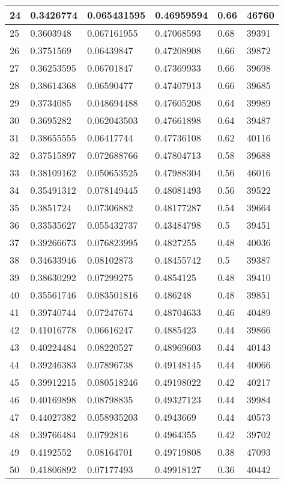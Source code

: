 \begin{longtable}{|l|l|l|l|l|l|}
24 & 0.3426774 & 0.065431595 & 0.46959594 & 0.66 & 46760 \\ \hline 
25 & 0.3603948 & 0.067161955 & 0.47068593 & 0.68 & 39391 \\ \hline 
26 & 0.3751569 & 0.06439847 & 0.47208908 & 0.66 & 39872 \\ \hline 
27 & 0.36253595 & 0.06701847 & 0.47369933 & 0.66 & 39698 \\ \hline 
28 & 0.38614368 & 0.06590477 & 0.47407913 & 0.66 & 39685 \\ \hline 
29 & 0.3734085 & 0.048694488 & 0.47605208 & 0.64 & 39989 \\ \hline 
30 & 0.3695282 & 0.062043503 & 0.47661898 & 0.64 & 39487 \\ \hline 
31 & 0.38655555 & 0.06417744 & 0.47736108 & 0.62 & 40116 \\ \hline 
32 & 0.37515897 & 0.072688766 & 0.47804713 & 0.58 & 39688 \\ \hline 
33 & 0.38109162 & 0.050653525 & 0.47988304 & 0.56 & 46016 \\ \hline 
34 & 0.35491312 & 0.078149445 & 0.48081493 & 0.56 & 39522 \\ \hline 
35 & 0.3851724 & 0.07306882 & 0.48177287 & 0.54 & 39664 \\ \hline 
36 & 0.33535627 & 0.055432737 & 0.43484798 & 0.5 & 39451 \\ \hline 
37 & 0.39266673 & 0.076823995 & 0.4827255 & 0.48 & 40036 \\ \hline 
38 & 0.34633946 & 0.08102873 & 0.48455742 & 0.5 & 39387 \\ \hline 
39 & 0.38630292 & 0.07299275 & 0.4854125 & 0.48 & 39410 \\ \hline 
40 & 0.35561746 & 0.083501816 & 0.486248 & 0.48 & 39851 \\ \hline 
41 & 0.39740744 & 0.07247674 & 0.48704633 & 0.46 & 40489 \\ \hline 
42 & 0.41016778 & 0.06616247 & 0.4885423 & 0.44 & 39866 \\ \hline 
43 & 0.40224484 & 0.08220527 & 0.48969603 & 0.44 & 40143 \\ \hline 
44 & 0.39246383 & 0.07896738 & 0.49148145 & 0.44 & 40066 \\ \hline 
45 & 0.39912215 & 0.080518246 & 0.49198022 & 0.42 & 40217 \\ \hline 
46 & 0.40169898 & 0.08798835 & 0.49327123 & 0.44 & 39984 \\ \hline 
47 & 0.44027382 & 0.058935203 & 0.4943669 & 0.44 & 40573 \\ \hline 
48 & 0.39766484 & 0.0792816 & 0.4964355 & 0.42 & 39702 \\ \hline 
49 & 0.4192552 & 0.08164701 & 0.49719808 & 0.38 & 47093 \\ \hline 
50 & 0.41806892 & 0.07177493 & 0.49918127 & 0.36 & 40442 \\ \hline 
\end{longtable}